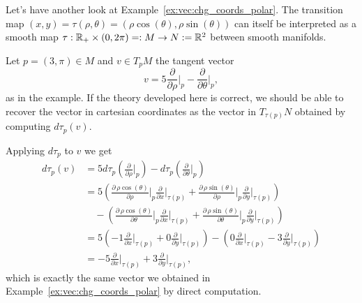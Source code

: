 \begin{example}
	Let's have another look at Example~\ref{ex:vec:chg_coords_polar}.
	The transition map $(x,y) = \tau(\rho,\theta) = (\rho\cos(\theta), \rho\sin(\theta))$ can itself be interpreted as a smooth map $\tau: \mathbb{R}_+\times(0,2\pi)=:M \to N:=\mathbb{R}^2$ between smooth manifolds.

	Let $p=(3, \pi) \in M$ and $v\in T_pM$ the tangent vector
	\begin{equation}
		v = 5\frac{\partial}{\partial \rho}\Big|_p - \frac{\partial}{\partial \theta}\Big|_p,
	\end{equation}
	as in the example.
	If the theory developed here is correct, we should be able to recover the vector in cartesian coordinates as the vector in $T_{\tau(p)}N$ obtained by computing $d\tau_p(v)$.

	Applying $d\tau_p$ to $v$ we get
	\begin{align}
		d\tau_p (v)
		 & = 5 d\tau_p \left(\frac{\partial}{\partial \rho}\Big|_p\right) - d\tau_p \left(\frac{\partial}{\partial \theta}\Big|_p\right)                                                                                                        \\
		 & = 5 \left(\frac{\partial\, \rho \cos(\theta)}{\partial \rho}\Big|_p \frac{\partial}{\partial x}\Big|_{\tau(p)} + \frac{\partial\, \rho \sin(\theta)}{\partial \rho}\Big|_p \frac{\partial}{\partial y}\Big|_{\tau(p)}\right)
		\\
		 & \quad - \left(\frac{\partial\, \rho \cos(\theta)}{\partial \theta}\Big|_p \frac{\partial}{\partial x}\Big|_{\tau(p)} + \frac{\partial\, \rho \sin(\theta)}{\partial \theta}\Big|_p \frac{\partial}{\partial y}\Big|_{\tau(p)}\right) \\
		 & = 5 \left(-1 \frac{\partial}{\partial x}\Big|_{\tau(p)} + 0 \frac{\partial}{\partial y}\Big|_{\tau(p)}\right)
		- \left(0 \frac{\partial}{\partial x}\Big|_{\tau(p)} - 3 \frac{\partial}{\partial y}\Big|_{\tau(p)}\right)                                                                                                                              \\
		 & = -5 \frac{\partial}{\partial x}\Big|_{\tau(p)} + 3 \frac{\partial}{\partial y}\Big|_{\tau(p)},
	\end{align}
	which is exactly the same vector we obtained in Example~\ref{ex:vec:chg_coords_polar} by direct computation.


\end{example}
